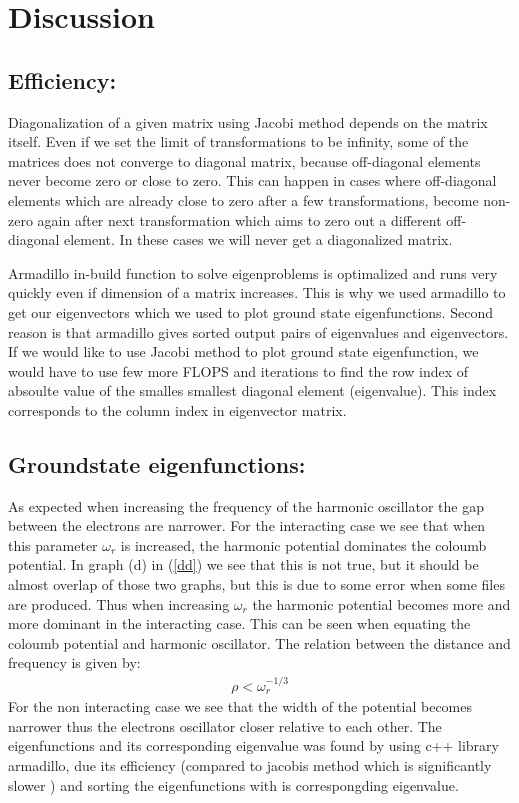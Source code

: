 \documentclass[a4paper, 10pt]{article}
\begin{document}
\section{Discussion}
\subsection{Efficiency:}
Diagonalization of a given matrix using Jacobi method depends on the matrix
itself. Even if we set the limit of transformations to be infinity, some of the
matrices does not converge to diagonal matrix, because off-diagonal elements
never become zero or close to zero. This can happen in cases where off-diagonal
elements which are already close to zero after a few transformations, become
non-zero again after next transformation which aims to zero out a different
off-diagonal element. In these cases we will never get a diagonalized matrix.

Armadillo in-build function to solve eigenproblems is optimalized and runs very
quickly even if dimension of a matrix increases. This is why we used armadillo
to get our eigenvectors which we used to plot ground state eigenfunctions.
Second reason is that armadillo gives sorted output pairs of eigenvalues and
eigenvectors. If we would like to use Jacobi method to plot ground state
eigenfunction, we would have to use few more FLOPS and iterations to find the
row index of absoulte value of the smalles smallest diagonal element
(eigenvalue). This index corresponds to the column index in eigenvector matrix.

\subsection{Groundstate eigenfunctions:} As expected when increasing the frequency of
the harmonic oscillator the gap between the electrons are narrower. For the interacting
case we see that when this parameter $\omega_{r}$ is increased, the harmonic potential
dominates the coloumb potential. In graph (d) in (\ref{dd}) we see that this is not true,
but it should be almost overlap of those two graphs, but this is due to some error when some files are
produced. Thus when increasing $\omega_{r}$ the harmonic potential becomes more and more
dominant in the interacting case. This can be seen when equating the coloumb potential and
harmonic oscillator. The relation between the distance and frequency is given by:
\begin{align}
  \rho < \omega_{r}^{-1/3}
\end{align}
For the non interacting case we see that the
width of the potential becomes narrower thus the electrons oscillator closer relative to each other. The eigenfunctions and its corresponding
eigenvalue was found by using c++ library armadillo, due its efficiency (compared to jacobis method which is significantly slower )
and sorting the eigenfunctions with is correspongding eigenvalue.
\end{document}
